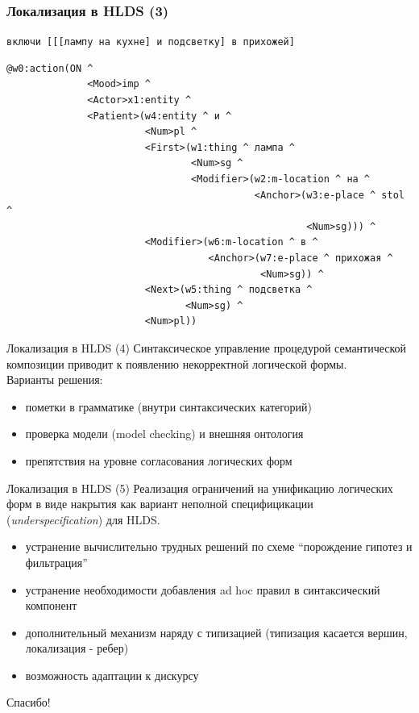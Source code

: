 \documentclass{beamer}
\begin{document}
\begin{frame}[fragile]
\frametitle{Локализация в HLDS (3)}
\texttt{включи [[[лампу на кухне] и подсветку] в прихожей]}\\
\begin{center}
{\scriptsize \begin{verbatim}
@w0:action(ON ^ 
              <Mood>imp ^ 
              <Actor>x1:entity ^ 
              <Patient>(w4:entity ^ и ^ 
                        <Num>pl ^ 
                        <First>(w1:thing ^ лампа ^ 
                                <Num>sg ^ 
                                <Modifier>(w2:m-location ^ на ^ 
                                           <Anchor>(w3:e-place ^ stol ^ 
                                                    <Num>sg))) ^ 
                        <Modifier>(w6:m-location ^ в ^ 
                                   <Anchor>(w7:e-place ^ прихожая ^ 
                                            <Num>sg)) ^ 
                        <Next>(w5:thing ^ подсветка ^ 
                               <Num>sg) ^ 
                        <Num>pl))
\end{verbatim}
}                        
\end{center}
\end{frame}


\begin{frame}{Локализация в HLDS (4)}
Синтаксическое управление процедурой семантической композиции приводит к появлению некорректной логической формы.\\
\bigskip
Варианты решения:\\
\bigskip
\begin{itemize}
	\item пометки в грамматике (внутри синтаксических категорий)
	\item проверка модели (model checking) и внешняя онтология
	\item препятствия на уровне согласования логических форм
\end{itemize}
\end{frame}

\begin{frame}{Локализация в HLDS (5)}
Реализация ограничений на унификацию логических форм в виде накрытия как вариант неполной специфицикации (\textit{underspecification}) для HLDS.\\
\bigskip
\begin{itemize}
	\item устранение вычислительно трудных решений по схеме ``порождение гипотез и фильтрация''
	\item устранение необходимости добавления ad hoc правил в синтаксический компонент
	\item дополнительный механизм наряду с типизацией (типизация касается вершин, локализация - ребер)
	\item возможность адаптации к дискурсу
\end{itemize}
\end{frame}


\begin{frame}{}
    \thispagestyle{empty}
    \begin{center}
        {\large Спасибо!}
    \end{center}
\end{frame}


\end{document}
